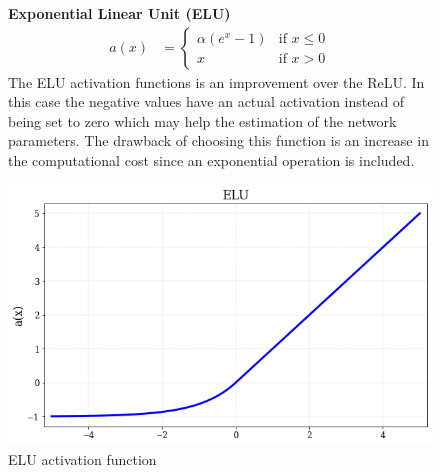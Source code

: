 \begin{figure}[!h]

\begin{minipage}{0.5\textwidth}
    \textbf{Exponential Linear Unit (ELU)}
   \begin{align}
        a(x) &= 
        \begin{cases}
        \alpha \left(e^x -1\right)  & \text{if } x \leq 0 \\
        x  & \text{if } x > 0 
  \end{cases}
\end{align}
The ELU\cite{elu} activation functions is an improvement over the ReLU. In this case the negative values have an actual activation instead of being set to zero which may help the estimation of the network parameters. The drawback of choosing this function is an increase in the computational cost since an exponential operation is included. 
\end{minipage}
\hfill
\begin{minipage}{0.45\textwidth}
    \centering
\includegraphics[width=\textwidth]{sections/03/Images/ELU.png}
\caption{ELU activation function}
    \label{fig:elu}
\end{minipage}
\end{figure}  


